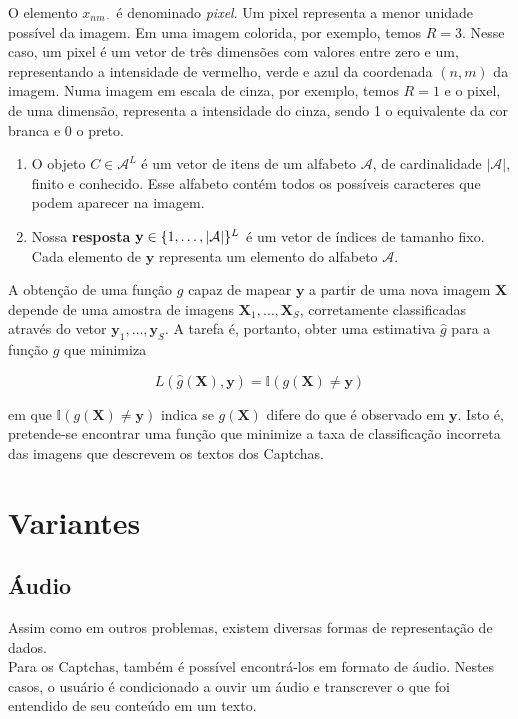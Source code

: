 \documentclass[12pt,]{report}
\begin{document}
O elemento \(x_{nm\cdot}\) é denominado \emph{pixel}. Um pixel
representa a menor unidade possível da imagem. Em uma imagem colorida,
por exemplo, temos \(R=3\). Nesse caso, um pixel é um vetor de três
dimensões com valores entre zero e um, representando a intensidade de
vermelho, verde e azul da coordenada \((n, m)\) da imagem. Numa imagem
em escala de cinza, por exemplo, temos \(R=1\) e o pixel, de uma
dimensão, representa a intensidade do cinza, sendo 1 o equivalente da
cor branca e 0 o preto.

\begin{enumerate}
\def\labelenumi{\arabic{enumi}.}
\setcounter{enumi}{1}
\item
  O objeto \(C \in \mathcal A^L\) é um vetor de itens de um alfabeto
  \(\mathcal A\), de cardinalidade \(|\mathcal A|\), finito e conhecido.
  Esse alfabeto contém todos os possíveis caracteres que podem aparecer
  na imagem.
\item
  Nossa \textbf{resposta}
  \(\mathbf y \in \mathbb \{1, \dots, |\mathcal A|\}^L\) é um vetor de
  índices de tamanho fixo. Cada elemento de \(\mathbf y\) representa um
  elemento do alfabeto \(\mathcal A\).
\end{enumerate}

A obtenção de uma função \(g\) capaz de mapear \(\mathbf y\) a partir de
uma nova imagem \(\mathbf X\) depende de uma amostra de imagens
\(\mathbf X_1, \dots, \mathbf X_S\), corretamente classificadas através
do vetor \(\mathbf y_1, \dots, \mathbf y_S\). A tarefa é, portanto,
obter uma estimativa \(\hat g\) para a função \(g\) que minimiza

\[
L(\hat g(\mathbf X), \mathbf y) = \mathbb I(g(\mathbf X) \neq \mathbf y)
\]

em que \(\mathbb I(g(\mathbf X) \neq \mathbf y)\) indica se
\(g(\mathbf X)\) difere do que é observado em \(\mathbf y\). Isto é,
pretende-se encontrar uma função que minimize a taxa de classificação
incorreta das imagens que descrevem os textos dos Captchas.

\section{Variantes}\label{variantes}

\subsection{Áudio}\label{audio}

Assim como em outros problemas, existem diversas formas de representação
de dados.\\
Para os Captchas, também é possível encontrá-los em formato de áudio.
Nestes casos, o usuário é condicionado a ouvir um áudio e transcrever o
que foi entendido de seu conteúdo em um texto.
\end{document}
